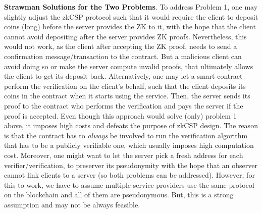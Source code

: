 \noindent\textbf{{Strawman Solutions for the Two Problems}}. To address  Problem 1, one may slightly adjust the zkCSP protocol such that it would require  the client to deposit coins (long) before the server provides the ZK to it, with the hope that the client cannot avoid depositing after the server  provides ZK proofs. Nevertheless, this would not work, as the client after accepting the ZK proof, needs to send a confirmation message/transaction to the contract. But a malicious client can avoid doing so or  make the server compute invalid proofs, that ultimately allows the client to get its deposit back.  Alternatively, one may let a smart contract  perform the verification on the client's behalf, such that the client deposits its coins in the contract when it starts using the service. Then, the server sends its proof to the contract who performs the verification and pays the server if the proof is accepted. Even though this approach would solve (only) problem 1 above, it imposes  high costs and defeats the purpose of zkCSP design. The reason is that the contract has to \emph{always} be involved to run the verification algorithm that  has to be a publicly verifiable one, which  usually imposes high computation cost. Moreover, one might want to let the server pick a fresh address for each verifier/verification, to  preserver its pseudonymity with the hope that an observer cannot link clients to a server (so both problems can be addressed). However, for this to work, we have to assume multiple service providers  use the same protocol on the blockchain and all of them are pseudonymous. But, this is a strong assumption and may  not be always feasible. 

















